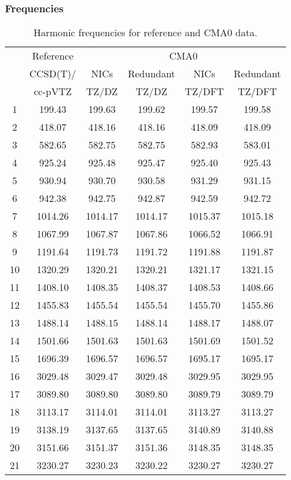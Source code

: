\documentclass[10pt,oneside]{article}
\begin{document}
\begin{table}[h!]
\subsubsection*{Frequencies}
\centering
\caption{Harmonic frequencies for reference and CMA0 data.}
\begin{tabular}{cccccc}
\toprule
{} & Reference & \multicolumn{4}{c}{CMA0} \\
{} &  CCSD(T)/ &    NICs &  Redundant &    NICs & Redundant \\
{} &   cc-pVTZ &   TZ/DZ &      TZ/DZ &  TZ/DFT &    TZ/DFT \\
\midrule
1  &    199.43 &  199.63 &     199.62 &  199.57 &    199.58 \\
2  &    418.07 &  418.16 &     418.16 &  418.09 &    418.09 \\
3  &    582.65 &  582.75 &     582.75 &  582.93 &    583.01 \\
4  &    925.24 &  925.48 &     925.47 &  925.40 &    925.43 \\
5  &    930.94 &  930.70 &     930.58 &  931.29 &    931.15 \\
6  &    942.38 &  942.75 &     942.87 &  942.59 &    942.72 \\
7  &   1014.26 & 1014.17 &    1014.17 & 1015.37 &   1015.18 \\
8  &   1067.99 & 1067.87 &    1067.86 & 1066.52 &   1066.91 \\
9  &   1191.64 & 1191.73 &    1191.72 & 1191.88 &   1191.87 \\
10 &   1320.29 & 1320.21 &    1320.21 & 1321.17 &   1321.15 \\
11 &   1408.10 & 1408.35 &    1408.37 & 1408.53 &   1408.66 \\
12 &   1455.83 & 1455.54 &    1455.54 & 1455.70 &   1455.86 \\
13 &   1488.14 & 1488.15 &    1488.14 & 1488.17 &   1488.07 \\
14 &   1501.66 & 1501.63 &    1501.63 & 1501.69 &   1501.52 \\
15 &   1696.39 & 1696.57 &    1696.57 & 1695.17 &   1695.17 \\
16 &   3029.48 & 3029.47 &    3029.48 & 3029.95 &   3029.95 \\
17 &   3089.80 & 3089.80 &    3089.80 & 3089.79 &   3089.79 \\
18 &   3113.17 & 3114.01 &    3114.01 & 3113.27 &   3113.27 \\
19 &   3138.19 & 3137.65 &    3137.65 & 3140.89 &   3140.88 \\
20 &   3151.66 & 3151.37 &    3151.36 & 3148.35 &   3148.35 \\
21 &   3230.27 & 3230.23 &    3230.22 & 3230.27 &   3230.27 \\
\bottomrule
\end{tabular}
\end{table}
\end{document}
